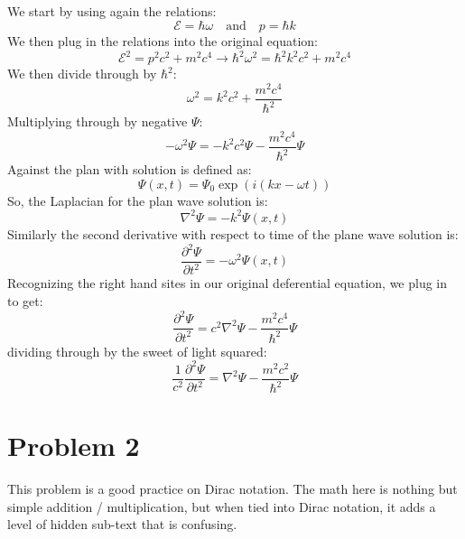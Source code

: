 \documentclass{article}
\begin{document}
\subsection{}
We start by using again the relations:
\begin{equation}
    \mathcal{E} = \hbar\omega \quad \text{and} \quad p = \hbar k
\end{equation}
We then plug in the relations into the original equation:
\begin{equation}
    \mathcal{E}^2 = p^2c^2 + m^2c^4 \rightarrow \hbar^2 \omega^2 = \hbar^2 k^2 c^2 + m^2c^4
\end{equation}
We then divide through by $\hbar^2$:
\begin{equation}
    \omega^2 = k^2 c^2 + \frac{m^2c^4}{\hbar^2}
\end{equation}
Multiplying through by negative $\Psi$:
\begin{equation}
    -\omega^2 \Psi = -k^2 c^2 \Psi - \frac{m^2c^4}{\hbar^2} \Psi
\end{equation}
Against the plan with solution is defined as:
\begin{equation}
    \Psi(x, t) = \Psi_0 \exp(i(kx - \omega t))
\end{equation}
So, the Laplacian for the plan wave solution is:
\begin{equation}
    \nabla^2 \Psi = -k^2 \Psi(x, t)
\end{equation}
Similarly the second derivative with respect to time of the plane wave solution is:
\begin{equation}
    \frac{\partial^2 \Psi}{\partial t^2} = -\omega^2 \Psi(x, t)
\end{equation}
Recognizing the right hand sites in our original deferential equation, we plug in to get:
\begin{equation}
    \frac{\partial^2 \Psi}{\partial t^2} = c^{2}\nabla^2 \Psi - \frac{m^2c^4}{\hbar^2} \Psi
\end{equation}
dividing through by the sweet of light squared:
\begin{equation}
    \frac{1}{c^2} \frac{\partial^2 \Psi}{\partial t^2} = \nabla^2 \Psi - \frac{m^2c^2}{\hbar^2} \Psi
\end{equation}
\section{Problem 2}

This problem is a good practice on Dirac notation. The math here is nothing but simple addition / multiplication, but when tied into Dirac notation, it adds a level of hidden sub-text that is confusing.
\end{document}
